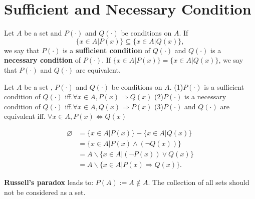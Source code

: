 \documentclass{book}
\numberwithin{equation}{section}
\begin{document}
\section{Sufficient and Necessary Condition}
\begin{definitionenv}
    Let $A$ be a set and $P(\cdot)$ and $Q(\cdot)$ be conditions on $A$.
    If $$\{x\in A|P(x)\}\subseteq\{x\in A|Q(x)\}, $$ we say that $P(\cdot)$ is a \textbf{sufficient condition} of $Q(\cdot)$ and $Q(\cdot)$ is a \textbf{necessary condition} of $P(\cdot)$. 
    If $\{x\in A|P(x)\}=\{x\in A|Q(x)\}$, we say that $P(\cdot)$ and $Q(\cdot)$ are equivalent.
\end{definitionenv}
\begin{propositionenv}
    Let $A$ be a set , $P(\cdot)$ and $Q(\cdot)$ be conditions on $A$.
    \newline
    (1)$P(\cdot)$ is a sufficient condition of $Q(\cdot)$ iff.$\forall x\in A, P(x)\Rightarrow Q(x)$
    \newline
    (2)$P(\cdot) $ is a necessary condition of $Q(\cdot)$ iff.$\forall x\in A, Q(x)\Rightarrow P(x)$
    \newline
    (3)$P(\cdot)$ and $Q(\cdot)$ are equivalent iff. $\forall x\in A, P(x)\Leftrightarrow Q(x)$
\end{propositionenv}
\begin{proofenv}
\begin{align*}
    \varnothing&=\{x\in A|P(x)\}- \{x\in A|Q(x)\}\\
    &=\{x\in A|P(x)\wedge (\neg Q(x))\}\\
    &=A\backslash\{x\in A|(\neg P(x))\vee  Q(x)\}\\
    &=A\backslash\{x\in A |P(x)\Rightarrow Q(x)\}.
\end{align*}
\end{proofenv}
\begin{box2}
\textbf{Russell's paradox} leads to: $P(A):=A\notin A$. The collection of all sets should not be considered as a set.
\end{box2}
\end{document}
